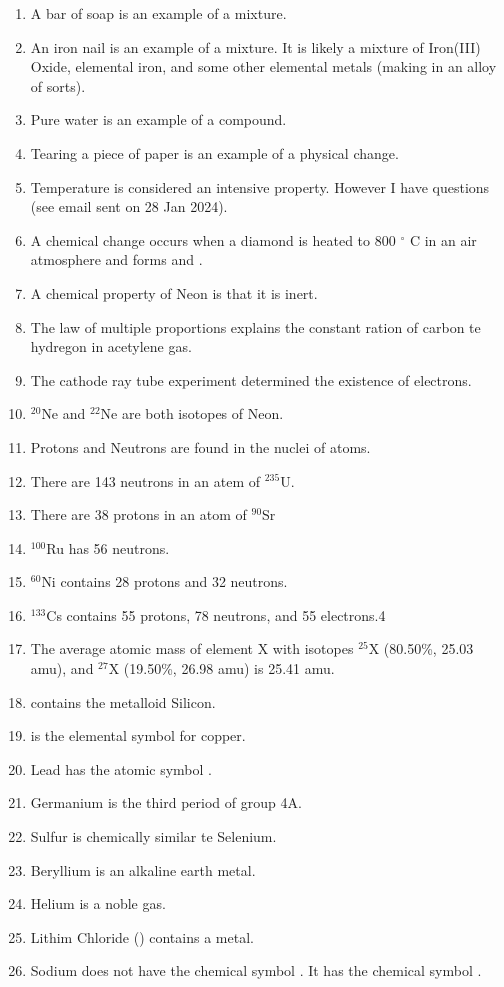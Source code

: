 \documentclass[11pt, letterpaper]{article}
\newcommand{\degree}{\ensuremath{{}^{\circ}}\xspace}
\begin{document}
\begin{enumerate}
	\item A bar of soap is an example of a mixture.
	\item An iron nail is an example of a mixture. It is likely a mixture of Iron(III) Oxide, elemental iron, and some other elemental metals (making in an alloy of sorts).
	\item Pure water is an example of a compound.
	\item Tearing a piece of paper is an example of a physical change.
	\item Temperature is considered an intensive property. However I have questions (see email sent on 28 Jan 2024).
	\item A chemical change occurs when a diamond is heated to 800 \degree C in an air atmosphere and forms  and .
	\item A chemical property of Neon is that it is inert.
	\item The law of multiple proportions explains the constant ration of carbon te hydregon in acetylene gas.
	\item The cathode ray tube experiment determined the existence of electrons.
	\item $^{20}$Ne and $^{22}$Ne are both isotopes of Neon.
	\item Protons and Neutrons are found in the nuclei of atoms.
	\item There are 143 neutrons in an atem of $^{235}$U.
	\item There are 38 protons in an atom of $^{90}$Sr
	\item $^{100}$Ru has 56 neutrons.
	\item $^{60}$Ni contains 28 protons and 32 neutrons.
	\item $^{133}$Cs contains 55 protons, 78 neutrons, and 55 electrons.4
	\item The average atomic mass of element X with isotopes $^{25}$X (80.50\%, 25.03 amu), 
		and $^{27}$X (19.50\%, 26.98 amu) is 25.41 amu.
	\item {} contains the metalloid Silicon.
	\item {} is the elemental symbol for copper.
	\item Lead has the atomic symbol .
	\item Germanium is the third period of group 4A.
	\item Sulfur is chemically similar te Selenium.
	\item Beryllium is an alkaline earth metal.
	\item Helium is a noble gas.
	\item Lithim Chloride () contains a metal.
	\item Sodium does not have the chemical symbol . It has the chemical symbol .
\end{enumerate}
\end{document}
